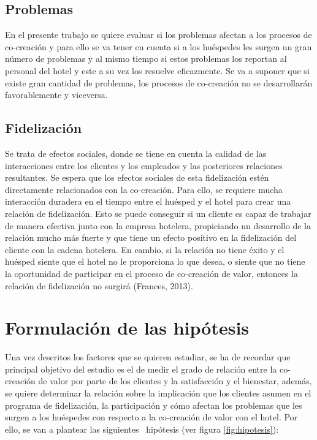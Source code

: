 \subsection{Problemas}

En el presente trabajo se quiere evaluar si los problemas afectan a los procesos de co-creación y para ello se va tener en cuenta si a los huéspedes les surgen un gran número de problemas y al mismo tiempo si estos problemas los reportan al personal del hotel y este a su vez los resuelve eficazmente. Se va a suponer que si existe gran cantidad de problemas, los procesos de co-creación no se desarrollarán favorablemente y viceversa.

\subsection{Fidelización}

Se trata de efectos sociales, donde se tiene en cuenta la calidad de las interacciones entre los clientes y los empleados y las posteriores relaciones resultantes. Se espera que los efectos sociales de esta fidelización estén directamente relacionados con la co-creación. Para ello, se requiere mucha interacción duradera en el tiempo entre el huésped y el hotel para crear una relación de fidelización. Esto se puede conseguir si un cliente es capaz de trabajar de manera efectiva junto con la empresa hotelera, propiciando un desarrollo de la relación mucho más fuerte y que tiene un efecto positivo en la fidelización del cliente con la cadena hotelera. En cambio, si la relación no tiene éxito y el huésped siente que el hotel no le proporciona lo que desea, o siente que no tiene la oportunidad de participar en el proceso de co-creación de valor, entonces la relación de fidelización no surgirá (Frances, 2013).

\section{Formulación de las hipótesis}

Una vez descritos los factores que se quieren estudiar, se ha de recordar que principal objetivo del estudio es el de medir el grado de relación entre la co-creación de valor por parte de los clientes y la satisfacción y el bienestar, además, se quiere determinar la relación sobre la implicación que los clientes asumen en el programa de fidelización, la participación y cómo afectan los problemas que les surgen a los huéspedes con respecto a la co-creación de valor con el hotel. Por ello, se van a plantear las siguientes  hipótesis (ver figura \ref{fig:hipotesis}):

